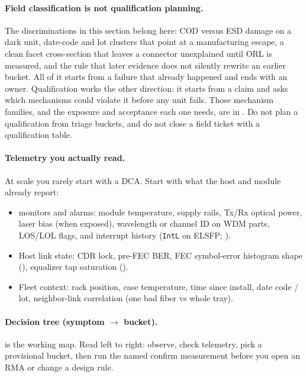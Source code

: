 \paragraph{Field classification is not qualification planning.}
The discriminations in this section belong here: COD versus ESD damage on a
dark unit, date-code and lot clusters that point at a manufacturing escape,
a clean facet cross-section that leaves a connector unexplained until ORL is
measured, and the rule that later evidence does not silently rewrite an
earlier bucket. All of it starts from a failure that already happened and ends
with an owner. Qualification works the other direction: it starts from a claim
and asks which mechanisms could violate it before any unit fails. Those
mechanism families, and the exposure and acceptance each one needs, are in
. Do not plan a
qualification from triage buckets, and do not close a field ticket with a
qualification table.

\paragraph{Telemetry you actually read.}
At scale you rarely start with a DCA. Start with what the host and module already
report:

\begin{itemize}
\item {} monitors and alarms: module temperature, supply
      rails, Tx/Rx optical power, laser bias (when exposed), wavelength or channel
      ID on WDM parts, LOS/LOL flags, and interrupt history (\texttt{IntL} on ELSFP;
      ).
\item Host link state: CDR lock, pre-FEC BER, FEC symbol-error histogram shape
      (), equalizer tap saturation ().
\item Fleet context: rack position, case temperature, time since install, date
      code / lot, neighbor-link correlation (one bad fiber vs whole tray).
\end{itemize}

\paragraph{Decision tree (symptom $\to$ bucket).}
 is the working map. Read left to right: observe, check
telemetry, pick a provisional bucket, then run the named confirm measurement
before you open an RMA or change a design rule.

